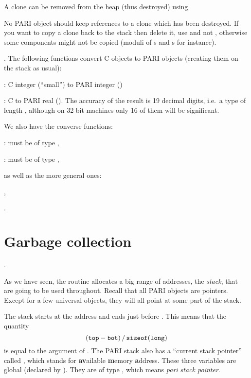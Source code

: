 
A clone can be removed from the heap (thus destroyed) using


\noindent No PARI object should keep references to a clone which has been
destroyed. If you want to copy a clone back to the stack then delete it, use
 and not , otherwise some components might not be
copied (moduli of s and s for instance).

.
The following functions convert C objects to PARI objects (creating them on
the stack as usual):

: C  integer  (``small'') to PARI integer
()

: C  to PARI real (). The
accuracy of the result is 19 decimal digits, i.e.~a type  of
length , although on 32-bit machines only 16 of them will
be significant.

\noindent We also have the converse functions:

:  must be of type ,

:  must be of type ,

\noindent as well as the more general ones:

,

.

\section{Garbage collection}\label{se:garbage}

.

\noindent
As we have seen, the  routine allocates a big range of
addresses, the \emph{stack}, that are going to be used throughout. Recall
that all PARI objects are pointers. Except for a few universal objects,
they will all point at some part of the stack.

The stack starts at the address  and ends just before . This
means that the quantity
%
$$ ({\tt top} - {\tt bot})\,/\,{\tt sizeof(long)} $$
%
is equal to the  argument of . The PARI
stack also has a ``current stack pointer'' called , which
stands for {\bf av}ailable {\bf m}emory {\bf a}ddress. These three variables
are global (declared by ). They are of type ,
which means \emph{pari stack pointer}.

